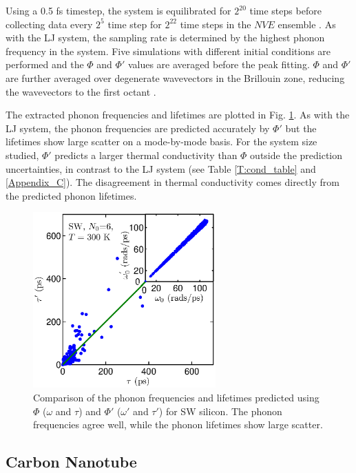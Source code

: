 \documentclass[12pt,twocolumn,iop]{/usr/share/texmf-texlive/tex/latex/iop/iopart}[/usr/share/texmf-texlive/tex/latex/iop/]
\begin{document}
Using a 0.5 fs timestep, the system is equilibrated for $2^{20}$ time steps before collecting data every $2^5$ time step for $2^{22}$ time steps in the $NVE$ ensemble \cite{mcquarrie2000}. As with the LJ system, the sampling rate is determined by the highest phonon frequency in the system. Five simulations with different initial conditions are performed and the $\Phi$ and $\Phi'$ values are averaged before the peak fitting. $\Phi$ and $\Phi'$ are further averaged over degenerate wavevectors in the Brillouin zone, reducing the wavevectors to the first octant \cite{mcgaugheythesis}.

The extracted phonon frequencies and lifetimes are plotted in Fig$.$ \ref{F:FREQ_LIFE_Si}. As with the LJ system, the phonon frequencies are predicted accurately by $\Phi'$ but the lifetimes show large scatter on a mode-by-mode basis. For the system size studied, $\Phi'$ predicts a larger thermal conductivity than $\Phi$ outside the prediction uncertainties, in contrast to the LJ system (see Table \ref{T:cond_table} and \ref{Appendix_C}). The disagreement in thermal conductivity comes directly from the predicted phonon lifetimes.

\begin{figure}
\begin{center}
\includegraphics[angle=0,width=70.0mm]{figure4.eps}
\vspace*{0mm}
\end{center}
\caption{\label{F:FREQ_LIFE_Si} Comparison of the phonon frequencies and lifetimes predicted using $\Phi$ ($\omega$ and $\tau$) and  $\Phi'$ ($\omega'$ and $\tau'$) for SW silicon. The phonon frequencies agree well, while the phonon lifetimes show large scatter.}
\end{figure}


\subsection{\label{S:Subsection_prop_CNT}Carbon Nanotube}
\end{document}

